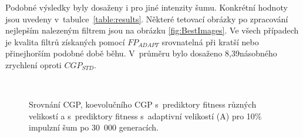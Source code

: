 \documentclass[czech]{ExcelAtFIT} %
\begin{document}
Podobné výsledky byly dosaženy i pro jiné in\-ten\-zity šumu. Konkrétní hodnoty jsou uvedeny v~ta\-bulce~\ref{table:results}. Některé tetovací obrázky po zpracování nejlepším nalezeným filtrem jsou na obrázku \ref{fig:BestImages}. Ve všech případech je kvalita filtrů získaných pomocí $\mathit{FP_{ADAPT}}$ srovnatelná při kratší nebo přinejhorším podobné době běhu. V~průměru bylo dosaženo 8,39násobného zrychlení oproti $\mathit{CGP_{STD}}$.


\begin{figure}[ht]
    \centering
    \\
    \caption{Srovnání CGP, koevolučního CGP s~prediktory fitness různých velikostí a s~prediktory fitness s~adaptivní velikostí (A) pro 10\% impulzní šum po 30~000 generacích.}
    \label{fig:ImpulseBoxplot}
\end{figure}
\end{document}

